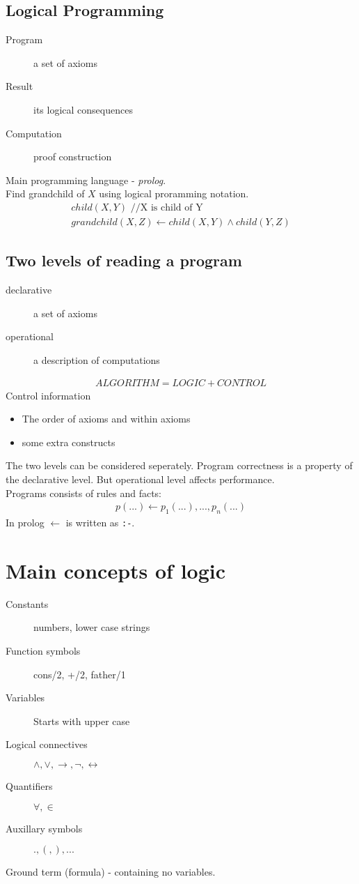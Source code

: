 \documentclass[a4paper]{article}
\begin{document}
\subsection{Logical Programming}
\begin{description}
\item[Program] a set of axioms
\item[Result] its logical consequences
\item[Computation] proof construction
\end{description}
Main programming language - \textit{prolog}.\\

Find grandchild of $X$ using logical proramming notation.
\begin{align}
  child(X,Y)  \mbox{ //X is child of Y}\\
  grandchild(X,Z) \leftarrow child(X,Y) \land child(Y,Z)
\end{align}

\subsection{Two levels of reading a program}
\begin{description}
\item[declarative] a set of axioms
\item[operational] a description of computations
\end{description}
\begin{align}
 ALGORITHM = LOGIC + CONTROL
\end{align}
Control information
\begin{itemize}
\item The order of axioms and within axioms
\item some extra constructs
\end{itemize}
The two levels can be considered seperately. Program correctness is a property
of the declarative level. But operational level affects performance.
\\
Programs consists of rules and facts:
\begin{align}
  p(...)\leftarrow p_1(...),...,p_n(...)
\end{align}
In prolog $\leftarrow$ is written as \texttt{:-}.\\

\section{Main concepts of logic}
\begin{description}
\item[Constants] numbers, lower case strings
\item[Function symbols] cons/2, +/2, father/1
\item[Variables] Starts with upper case
\item[Logical connectives] $\land, \lor, \rightarrow, \lnot, \leftrightarrow$
\item[Quantifiers] $\forall, \in$
\item[Auxillary symbols] $.,(,),...$
\end{description}

Ground term (formula) - containing no variables.
\end{document}
